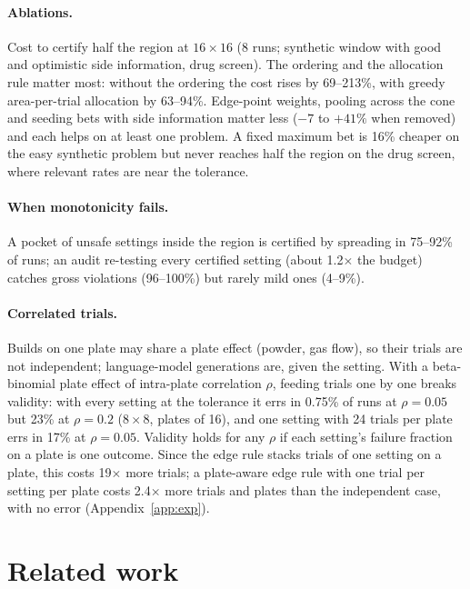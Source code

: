 \documentclass{article}
\begin{document}
\paragraph{Ablations.} Cost to certify half the region at $16\times16$
(8 runs; synthetic window with good and optimistic side information, drug
screen). The ordering and the allocation rule matter most: without the
ordering the cost rises by 69--213\%, with greedy area-per-trial
allocation by 63--94\%. Edge-point weights, pooling across the cone and
seeding bets with side information matter less ($-7$ to $+41\%$ when
removed) and each helps on at least one problem. A fixed maximum bet is
16\% cheaper on the easy synthetic problem but never reaches half the
region on the drug screen, where relevant rates are near the tolerance.

\paragraph{When monotonicity fails.} A pocket of unsafe settings inside the
region is certified by spreading in 75--92\% of runs; an audit re-testing
every certified setting (about 1.2$\times$ the budget) catches gross
violations (96--100\%) but rarely mild ones (4--9\%).

\paragraph{Correlated trials.} Builds on one plate may share a plate
effect (powder, gas flow), so their trials are not independent; language-model
generations are, given the setting. With a beta-binomial plate effect of
intra-plate correlation $\rho$, feeding trials one by one breaks validity:
with every setting at the tolerance it errs in 0.75\% of runs at $\rho=0.05$
but 23\% at $\rho=0.2$ ($8\times8$, plates of 16), and one setting with 24
trials per plate errs in 17\% at $\rho=0.05$. Validity holds for any $\rho$
if each setting's failure fraction on a plate is one outcome. Since the edge
rule stacks trials of one setting on a plate, this costs 19$\times$ more
trials; a plate-aware edge rule with one trial per setting per plate costs
2.4$\times$ more trials and plates than the independent case, with no error
(Appendix~\ref{app:exp}).

\section{Related work}
\end{document}
